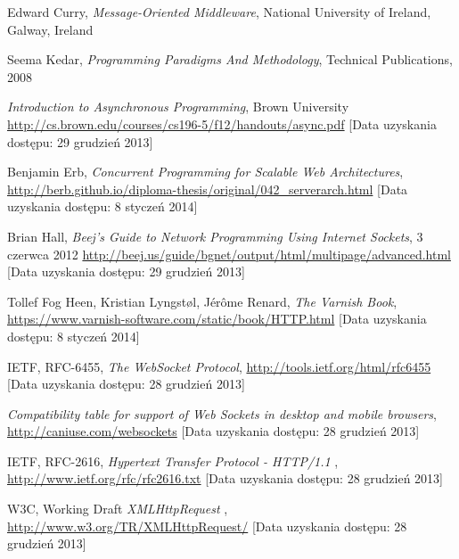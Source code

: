 \newpage

\begin{thebibliography}{1}
  
  
   Edward Curry, \emph{Message-Oriented Middleware}, National University of Ireland, Galway, Ireland

   Seema Kedar, \emph{Programming Paradigms And Methodology}, Technical Publications, 2008

   \emph{Introduction to Asynchronous Programming}, Brown University \url{http://cs.brown.edu/courses/cs196-5/f12/handouts/async.pdf} [Data uzyskania dostępu: 29 grudzień 2013]

   Benjamin Erb, \emph{Concurrent Programming for Scalable Web Architectures}, \url{http://berb.github.io/diploma-thesis/original/042_serverarch.html} [Data uzyskania dostępu: 8 styczeń 2014]
  
   Brian Hall, \emph{Beej's Guide to Network Programming Using Internet Sockets}, 3 czerwca 2012 \url{http://beej.us/guide/bgnet/output/html/multipage/advanced.html} [Data uzyskania dostępu: 29 grudzień 2013]

   Tollef Fog Heen, Kristian Lyngstøl, Jérôme Renard, \emph{The Varnish Book}, \url{https://www.varnish-software.com/static/book/HTTP.html} [Data uzyskania dostępu: 8 styczeń 2014]

   IETF, RFC-6455, \emph{The WebSocket Protocol}, \url{http://tools.ietf.org/html/rfc6455} [Data uzyskania dostępu: 28 grudzień 2013]

   \emph{Compatibility table for support of Web Sockets in desktop and mobile browsers}, \url{http://caniuse.com/websockets} [Data uzyskania dostępu: 28 grudzień 2013]

   IETF, RFC-2616, \emph{Hypertext Transfer Protocol - HTTP/1.1} , \url{http://www.ietf.org/rfc/rfc2616.txt} [Data uzyskania dostępu: 28 grudzień 2013]

   W3C, Working Draft \emph{XMLHttpRequest} , \url{http://www.w3.org/TR/XMLHttpRequest/} [Data uzyskania dostępu: 28 grudzień 2013]


\end{thebibliography}
